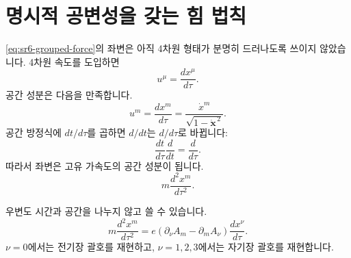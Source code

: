 \begin{classroomqa}\end{classroomqa}

\begin{classroomqa}\end{classroomqa}

\section{명시적 공변성을 갖는 힘 법칙}

\eqref{eq:sr6-grouped-force}의 좌변은 아직 4차원 형태가 분명히 드러나도록 쓰이지 않았습니다. 4차원 속도를 도입하면
\begin{equation}
u^\mu=\frac{dx^\mu}{d\tau}.
\label{eq:sr6-four-velocity}
\end{equation}
공간 성분은 다음을 만족합니다.
\begin{equation}
u^m
=
\frac{dx^m}{d\tau}
=
\frac{\dot x^m}{\sqrt{1-\dot{\mathbf x}^{\,2}}}.
\end{equation}
공간 방정식에 \(dt/d\tau\)를 곱하면 \(d/dt\)는 \(d/d\tau\)로 바뀝니다:
\begin{equation}
\frac{dt}{d\tau}\frac{d}{dt}
=
\frac{d}{d\tau}.
\end{equation}
따라서 좌변은 고유 가속도의 공간 성분이 됩니다.
\begin{equation}
m\frac{d^2x^m}{d\tau^2}.
\end{equation}

우변도 시간과 공간을 나누지 않고 쓸 수 있습니다.
\begin{equation}
m\frac{d^2x^m}{d\tau^2}
=
e\left(\partial_\nu A_m-\partial_mA_\nu\right)
\frac{dx^\nu}{d\tau}.
\label{eq:sr6-spatial-covariant-force}
\end{equation}
\(\nu=0\)에서는 전기장 괄호를 재현하고, \(\nu=1,2,3\)에서는 자기장 괄호를 재현합니다.

